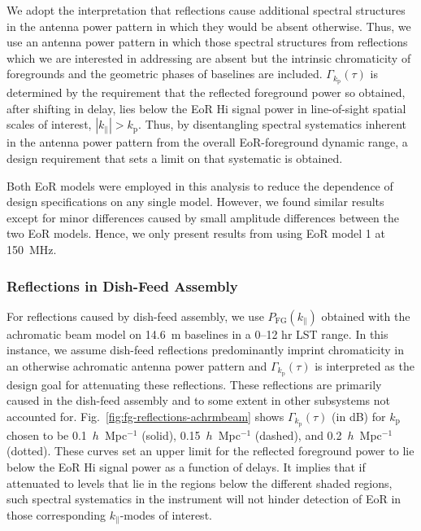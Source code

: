 \documentclass[preprint2,iop,numberedappendix,twocolappendix,appendixfloats]{emulateapj}
\begin{document}
We adopt the interpretation that reflections cause additional spectral structures in the antenna power pattern in which they would be absent otherwise. Thus, we use an antenna power pattern in which those spectral structures from reflections which we are interested in addressing are absent but the intrinsic chromaticity of foregrounds and the geometric phases of baselines are included. $\Gamma_{k_\textrm{p}}(\tau)$ is determined by the requirement that the reflected foreground power so obtained, after shifting in delay, lies below the EoR H{\sc i} signal power in line-of-sight spatial scales of interest, $|k_\parallel|>k_\textrm{p}$. Thus, by disentangling spectral systematics inherent in the antenna power pattern from the overall EoR-foreground dynamic range, a design requirement that sets a limit on that systematic is obtained.

Both EoR models were employed in this analysis to reduce the dependence of design specifications on any single model. However, we found similar results except for minor differences caused by small amplitude differences between the two EoR models. Hence, we only present results from using EoR model 1 at 150~MHz.

\subsubsection{Reflections in Dish-Feed Assembly}\label{sec:dish-feed-reflections}

For reflections caused by dish-feed assembly, we use $P_\textrm{FG}(k_\parallel)$ obtained with the achromatic beam model on 14.6~m baselines in a 0--12 hr LST range. In this instance, we assume dish-feed reflections predominantly imprint chromaticity in an otherwise achromatic antenna power pattern and $\Gamma_{k_\textrm{p}}(\tau)$ is interpreted as the design goal for attenuating these reflections. These reflections are primarily caused in the dish-feed assembly and to some extent in other subsystems not accounted for. Fig.~\ref{fig:fg-reflections-achrmbeam} shows $\Gamma_{k_\textrm{p}}(\tau)$ (in dB) for $k_\textrm{p}$ chosen to be 0.1~$h$~Mpc$^{-1}$ (solid), 0.15~$h$~Mpc$^{-1}$ (dashed), and 0.2~$h$~Mpc$^{-1}$ (dotted). These curves set an upper limit for the reflected foreground power to lie below the EoR H{\sc i} signal power as a function of delays. It implies that if attenuated to levels that lie in the regions below the different shaded regions, such spectral systematics in the instrument will not hinder detection of EoR in those corresponding $k_\parallel$-modes of interest. 
\end{document}
